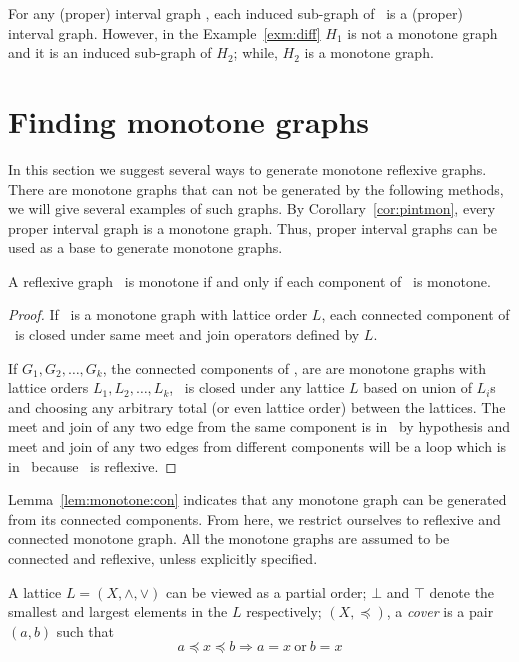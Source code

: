 For any (proper) interval graph \mH, each induced sub-graph of \mH\ is a 
(proper) interval graph. However, in the Example~\ref{exm:diff} \(H_1\)
is not a monotone graph and it is an induced 
sub-graph of \(H_2\); while, \(H_2\) is a monotone graph.

\section{Finding monotone graphs}
In this section we suggest several ways to generate monotone reflexive graphs.
There are monotone graphs that can not be generated by the following methods,
we will give several examples of such graphs.
By Corollary~\ref{cor:pintmon}, every proper interval graph is a monotone graph.
Thus, proper interval graphs can be used as a base to generate monotone graphs.

\begin{lemma} \label{lem:monotone:con}
A reflexive graph \mG\ is monotone if and only if each component of \mG\ is monotone.
\end{lemma}

\begin{proof}
If \mG\ is a monotone graph with lattice order \(L\), each connected component of \mG\ is
closed under same meet and join operators defined by \(L\)\@. 

If \(G_1,G_2,\dotsc,G_k\), the connected components of \mG, are
are monotone graphs with lattice orders \(L_1,L_2,\dotsc,L_k\),
\mG\ is closed under any lattice \(L\) based on union of \(L_i\)s
and choosing any arbitrary total (or even lattice order) between the
lattices. The meet and join of any two edge from the same component is in
\mG\ by hypothesis and meet and join of any two edges from different components 
will be a loop which is in \mg\ because \mG\ is reflexive. 
\end{proof}

Lemma~\ref{lem:monotone:con} indicates that any monotone graph can be generated
from its connected components. From here, we restrict ourselves to
reflexive and connected monotone graph. All the monotone graphs are
assumed to be connected and reflexive, unless explicitly specified.

A lattice \(L=(X,\wedge,\vee)\) can be viewed as a partial order;
\(\bot\) and \(\top\) denote the smallest and largest elements in the \(L\) 
respectively; \((X,\preceq)\), a \emph{cover} is a pair \((a,b)\) such that
\[a \preceq x \preceq b \Rightarrow a = x\ \mathrm{or}\ b = x\]

